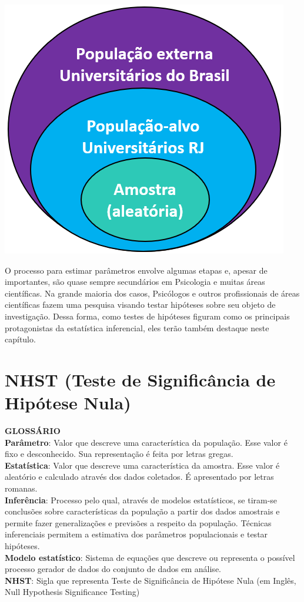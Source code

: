 \documentclass[
]{book}
\begin{document}
\includegraphics{./img/cap_inferencia_amostra_populacao.png}

O processo para estimar parâmetros envolve algumas etapas e, apesar de importantes, são quase sempre secundários em Psicologia e muitas áreas científicas. Na grande maioria dos casos, Psicólogos e outros profissionais de áreas científicas fazem uma pesquisa visando testar hipóteses sobre seu objeto de investigação. Dessa forma, como testes de hipóteses figuram como os principais protagonistas da estatística inferencial, eles terão também destaque neste capítulo.

\hypertarget{nhst-teste-de-significuxe2ncia-de-hipuxf3tese-nula}{%
\section{NHST (Teste de Significância de Hipótese Nula)}\label{nhst-teste-de-significuxe2ncia-de-hipuxf3tese-nula}}

\begin{glossario}
\textbf{GLOSSÁRIO}\\
\textbf{Parâmetro}: Valor que descreve uma característica da população.
Esse valor é fixo e desconhecido. Sua representação é feita por letras
gregas.\\
\textbf{Estatística}: Valor que descreve uma característica da amostra.
Esse valor é aleatório e calculado através dos dados coletados. É
apresentado por letras romanas.\\
\textbf{Inferência}: Processo pelo qual, através de modelos
estatísticos, se tiram-se conclusões sobre características da população
a partir dos dados amostrais e permite fazer generalizações e previsões
a respeito da população. Técnicas inferenciais permitem a estimativa dos
parâmetros populacionais e testar hipóteses.\\
\textbf{Modelo estatístico}: Sistema de equações que descreve ou
representa o possível processo gerador de dados do conjunto de dados em
análise.\\
\textbf{NHST}: Sigla que representa Teste de Significância de Hipótese
Nula (em Inglês, Null Hypothesis Significance Testing)
\end{glossario}
\end{document}
